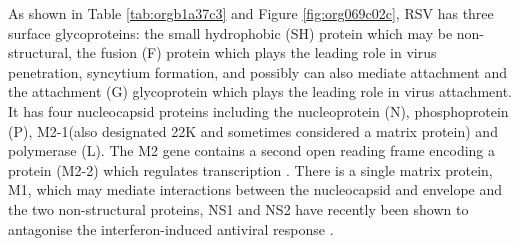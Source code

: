\documentclass[10pt, a4paper]{article}
\begin{document}
As shown in Table \ref{tab:orgb1a37c3} and Figure \ref{fig:org069c02c}, RSV has three surface glycoproteins: the small
hydrophobic (SH) protein which may be non-structural, the fusion (F) protein
which plays the leading role in virus penetration, syncytium formation, and
possibly can also mediate attachment and the attachment (G) glycoprotein which
plays the leading role in virus attachment. It has four nucleocapsid proteins
including the nucleoprotein (N), phosphoprotein (P), M2-1(also designated 22K
and sometimes considered a matrix protein) and polymerase (L).
The M2 gene contains a second open reading frame encoding a protein (M2-2)
which regulates transcription \cite{fearnsRoleM21Transcription1999}.
There is a single matrix protein, M1, which may mediate interactions between the
nucleocapsid and envelope and the two non-structural proteins, NS1 and NS2  have
recently been shown to antagonise the interferon-induced antiviral response
\cite{fearnsRoleM21Transcription1999,schlenderBovineRespiratorySyncytial2000}.
\end{document}
